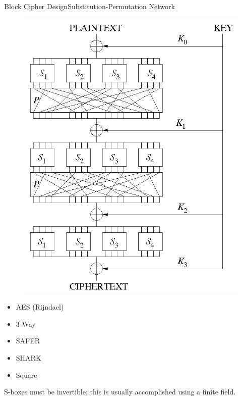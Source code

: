 \documentclass[12pt]{beamer}
\begin{document}
\begin{frame}{Block Cipher Design}{Substitution-Permutation Network}
	\centering
	\begin{minipage}{0.45\textwidth}
		\begin{figure}[h!]
			\centering
			\includegraphics[width=\textwidth,height=0.8\textheight,keepaspectratio]{spn}
		\end{figure}
	\end{minipage}
	\begin{minipage}{0.45\textwidth}
		\begin{itemize}
			\item AES (Rijndael)
			\item 3-Way
			\item SAFER
			\item SHARK
			\item Square
		\end{itemize}

		S-boxes must be invertible; this is usually accomplished using a finite
		field.
	\end{minipage}
\end{frame}
\end{document}
